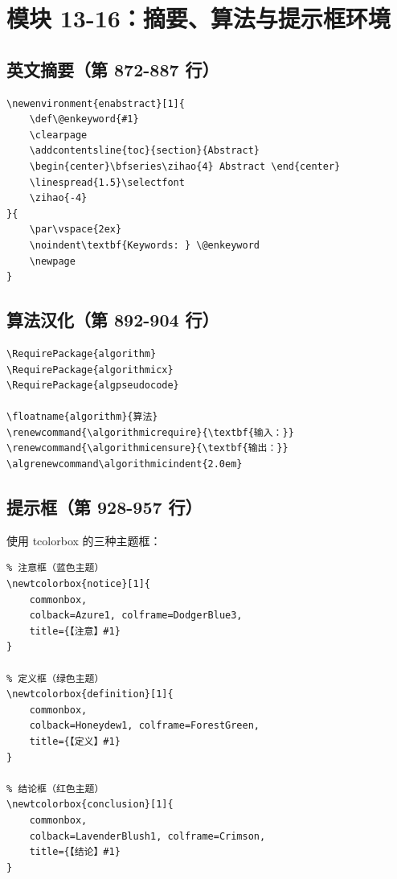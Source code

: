 \documentclass[linux]{hustreport}
\begin{document}
\newpage
\section{模块 13-16：摘要、算法与提示框环境}

\subsection{英文摘要（第 872-887 行）}

\begin{verbatim}
\newenvironment{enabstract}[1]{
    \def\@enkeyword{#1}
    \clearpage
    \addcontentsline{toc}{section}{Abstract}
    \begin{center}\bfseries\zihao{4} Abstract \end{center}
    \linespread{1.5}\selectfont
    \zihao{-4}
}{
    \par\vspace{2ex}
    \noindent\textbf{Keywords: } \@enkeyword
    \newpage
}
\end{verbatim}

\subsection{算法汉化（第 892-904 行）}

\begin{verbatim}
\RequirePackage{algorithm}
\RequirePackage{algorithmicx}
\RequirePackage{algpseudocode}

\floatname{algorithm}{算法}
\renewcommand{\algorithmicrequire}{\textbf{输入：}}
\renewcommand{\algorithmicensure}{\textbf{输出：}}
\algrenewcommand\algorithmicindent{2.0em}
\end{verbatim}

\subsection{提示框（第 928-957 行）}

使用 tcolorbox 的三种主题框：

\begin{verbatim}
% 注意框（蓝色主题）
\newtcolorbox{notice}[1]{
    commonbox,
    colback=Azure1, colframe=DodgerBlue3,
    title={【注意】#1}
}

% 定义框（绿色主题）
\newtcolorbox{definition}[1]{
    commonbox,
    colback=Honeydew1, colframe=ForestGreen,
    title={【定义】#1}
}

% 结论框（红色主题）
\newtcolorbox{conclusion}[1]{
    commonbox,
    colback=LavenderBlush1, colframe=Crimson,
    title={【结论】#1}
}
\end{verbatim}
\end{document}
